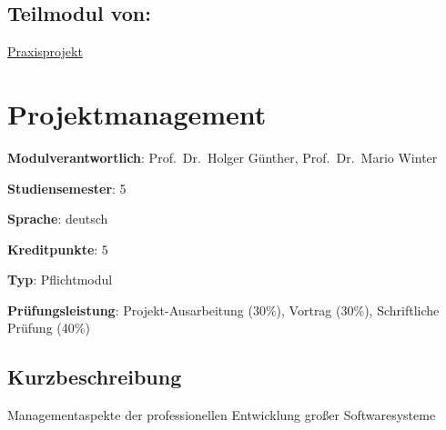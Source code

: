\hypertarget{teilmodul-vonpathlabelmi-2017modulbeschreibungen-bachelorba_praxisprojektseminar}{%
\section*{Teilmodul
von:\label{/mi-2017/modulbeschreibungen-bachelor/BA_Praxisprojektseminar}}\label{teilmodul-vonpathlabelmi-2017modulbeschreibungen-bachelorba_praxisprojektseminar}}

\hyperref[/mi-2017/modulbeschreibungen-bachelor/BA_Praxisprojekt]{Praxisprojekt}

\hypertarget{projektmanagementpathlabelmi-2017modulbeschreibungen-bachelorba_projektmanagement}{%
\chapter{Projektmanagement\label{/mi-2017/modulbeschreibungen-bachelor/BA_Projektmanagement}}\label{projektmanagementpathlabelmi-2017modulbeschreibungen-bachelorba_projektmanagement}}

\begin{modulHead}
\textbf{Modulverantwortlich}: Prof.~Dr.~Holger
Günther, Prof.~Dr.~Mario
Winter
\end{modulHead}
\begin{modulHead}
\textbf{Studiensemester}:
5
\end{modulHead}
\begin{modulHead}
\textbf{Sprache}:
deutsch
\end{modulHead}
\begin{modulHead}
\textbf{Kreditpunkte}:
5
\end{modulHead}
\begin{modulHead}
\textbf{Typ}:
Pflichtmodul
\end{modulHead}
\begin{modulHead}
\textbf{Prüfungsleistung}:
Projekt-Ausarbeitung (30\%), Vortrag (30\%), Schriftliche Prüfung
(40\%)
\end{modulHead}


\hypertarget{kurzbeschreibungpathlabelmi-2017modulbeschreibungen-bachelorba_projektmanagement}{%
\section*{Kurzbeschreibung\label{/mi-2017/modulbeschreibungen-bachelor/BA_Projektmanagement}}\label{kurzbeschreibungpathlabelmi-2017modulbeschreibungen-bachelorba_projektmanagement}}

Managementaspekte der professionellen Entwicklung großer Softwaresysteme


